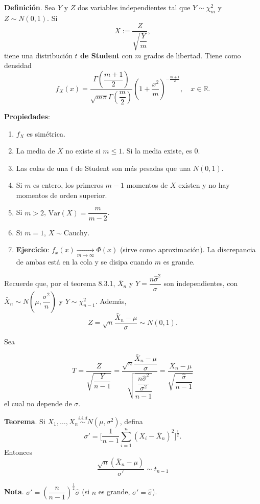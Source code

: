 \documentclass[
  12pt,
]{book}
\begin{document}
\textbf{Definición}. Sea \(Y\) y \(Z\) dos variables independientes tal que \(Y\sim \chi^2_m\) y \(Z\sim N(0,1)\). Si
\[X := \dfrac Z{\sqrt{\dfrac Ym}},\]
tiene una distribución \textbf{\(t\) de Student} con \(m\) grados de libertad. Tiene como densidad
\[f_X(x) = \dfrac{\Gamma\left(\dfrac{m+1}2\right)}{\sqrt{m\pi}\Gamma\left(\dfrac m2 \right)}\left(1+\dfrac{x^2}m\right)^{-\frac{m+1}2}, \quad x\in \mathbb R.\]

\textbf{Propiedades}:

\begin{enumerate}
\def\labelenumi{\arabic{enumi})}
\item
  \(f_X\) es simétrica.
\item
  La media de \(X\) no existe si \(m\leq 1\). Si la media existe, es 0.
\item
  Las colas de una \(t\) de Student son más pesadas que una \(N(0,1)\).
\item
  Si \(m\) es entero, los primeros \(m-1\) momentos de \(X\) existen y no hay momentos de orden superior.
\item
  Si \(m>2\), \(\text{Var}\left(X \right)=\dfrac m{m-2}\).
\item
  Si \(m=1\), \(X\sim \text{Cauchy}\).
\item
  \textbf{Ejercicio}: \(f_x(x)\xrightarrow[m\to \infty]{}\Phi(x)\) (sirve como aproximación). La discrepancia de ambas está en la cola y se disipa cuando \(m\) es grande.
\end{enumerate}

Recuerde que, por el teorema 8.3.1, \(\bar X_n\) y \(Y=\dfrac{n\hat\sigma^2}{\sigma}\) son independientes, con \(\bar X_n \sim N\left(\mu, \dfrac{\sigma^2}{n}\right)\) y \(Y\sim \chi^2_{n-1}\). Además,
\[Z = \sqrt n\dfrac{\bar X_n-\mu}{\sigma} \sim N(0,1).\]

Sea

\[T = \dfrac Z{\sqrt{\dfrac Y{n-1}}} = \dfrac{\sqrt n \dfrac{\bar X_n-\mu}{\sigma}} {\sqrt{\dfrac{\dfrac{n\hat\sigma^2}{\sigma^2}}{n-1}}} = \dfrac{\bar X_n-\mu}{\sqrt{\dfrac{\hat\sigma}{n-1}}}\]
el cual no depende de \(\sigma\).

\textbf{Teorema}. Si \(X_1,\dots, X_n \stackrel{i.i.d}{\sim} N(\mu,\sigma^2)\), defina
\[\sigma' = \bigg[\dfrac 1{n-1}\sum_{i=1}^n(X_i-\bar X_n)^2\bigg]^\frac 12.\]
Entonces
\[\dfrac{\sqrt{n}(\bar X_n-\mu)}{\sigma'} \sim t_{n-1}\]

\textbf{Nota}. \(\sigma' = \left(\dfrac n{n-1}\right)^\frac 12 \hat\sigma\) (si \(n\) es grande, \(\sigma' = \hat\sigma\)).
\end{document}

